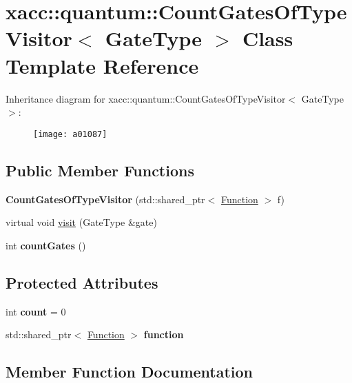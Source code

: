 \hypertarget{a01087}{}\section{xacc\+:\+:quantum\+:\+:Count\+Gates\+Of\+Type\+Visitor$<$ Gate\+Type $>$ Class Template Reference}
\label{a01087}
Inheritance diagram for xacc\+:\+:quantum\+:\+:Count\+Gates\+Of\+Type\+Visitor$<$ Gate\+Type $>$\+:\begin{figure}[H]
\begin{center}
\leavevmode
\texttt{[image: a01087]}
\end{center}
\end{figure}
\subsection*{Public Member Functions}
\begin{DoxyCompactItemize}
\item 
\mbox{\label{a01087_a4c2507e3ee4fe51e7ff4501bf5569cfc}} 
{\bfseries Count\+Gates\+Of\+Type\+Visitor} (std\+::shared\+\_\+ptr$<$ \hyperlink{a01151}{Function} $>$ f)
\item 
virtual void \hyperlink{a01087_a9c40e6cb4b74e2d6714c531ffc3b2909}{visit} (Gate\+Type \&gate)
\item 
\mbox{\label{a01087_a8a1a17ed50cd6727c2eb07976f886389}} 
int {\bfseries count\+Gates} ()
\end{DoxyCompactItemize}
\subsection*{Protected Attributes}
\begin{DoxyCompactItemize}
\item 
\mbox{\label{a01087_ae3d8ae4c40c1552ee68aa6e5002e42bd}} 
int {\bfseries count} = 0
\item 
\mbox{\label{a01087_a202ab6e0e365af735da706fe972333e7}} 
std\+::shared\+\_\+ptr$<$ \hyperlink{a01151}{Function} $>$ {\bfseries function}
\end{DoxyCompactItemize}


\subsection{Member Function Documentation}
\mbox{\label{a01087_a9c40e6cb4b74e2d6714c531ffc3b2909}} 
